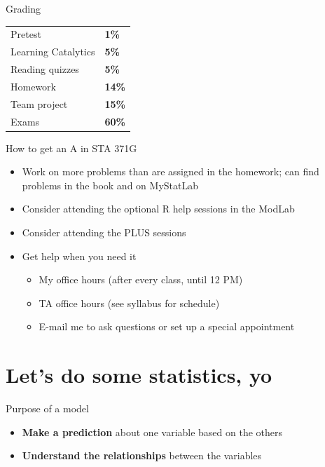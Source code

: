 \documentclass{beamer}\usepackage[]{graphicx}\usepackage[]{color}
\begin{document}
\begin{darkframes}
    \begin{frame}{Grading}
      \begin{center}
        \begin{tabular}{ll}
          Pretest             & \textbf{1\%}  \\
          Learning Catalytics & \textbf{5\%}  \\
          Reading quizzes     & \textbf{5\%}  \\
          Homework            & \textbf{14\%} \\
          Team project        & \textbf{15\%} \\
          Exams               & \textbf{60\%} \\
        \end{tabular}
      \end{center}
    \end{frame}

    \begin{frame}{How to get an A in STA 371G}
      \begin{itemize}
        \item Work on more problems than are assigned in the homework; can find problems in the book and on MyStatLab
        \item Consider attending the optional R help sessions in the ModLab
        \item Consider attending the PLUS sessions
        \item Get help when you need it
          \begin{itemize}
            \item My office hours (after every class, until 12 PM)
            \item TA office hours (see syllabus for schedule)
            \item E-mail me to ask questions or set up a special appointment
          \end{itemize}
      \end{itemize}
    \end{frame}

    \section{Let's do some statistics, yo}

    \begin{frame}{Purpose of a model}
      \begin{itemize}
        \item \textbf{Make a prediction} about one variable based on the others
        \item \textbf{Understand the relationships} between the variables
      \end{itemize}
    \end{frame}


\end{darkframes}
\end{document}
